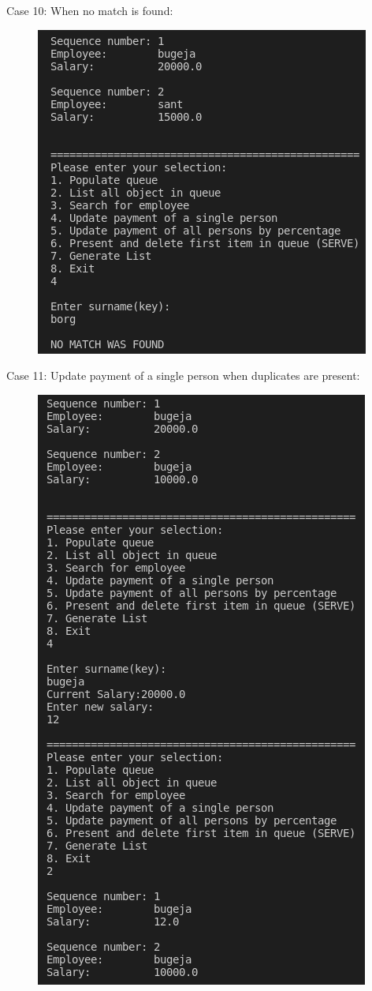 \documentclass[12pt]{article}
\begin{document}
Case 10: When no match is found:
\begin{figure}[h]
\centering
\includegraphics[scale=0.30]{Images/Testing 4/2.png}
\end{figure}

\newpage
Case 11: Update payment of a single person when duplicates are present:
\begin{figure}[h]
\centering
\includegraphics[scale=0.30]{Images/Testing 4/3.png}
\end{figure}
\end{document}
